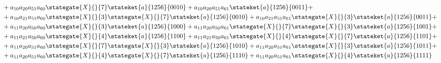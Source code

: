 \begin{align*}
             & +a_{10}a_{20}a_{51}a_{60} \stategate{X}{}{7}\stateket{a}{1256}{0010} +
  a_{10}a_{20}a_{51}a_{61} \stateket{a}{1256}{0011} +                                                                        \\
             & +a_{10}a_{21}a_{51}a_{60} \stategate{X}{}{3}\stategate{X}{}{7}\stateket{a}{1256}{0010} +
  a_{10}a_{21}a_{51}a_{61} \stategate{X}{}{3}\stateket{a}{1256}{0011} +                                                      \\
             & +a_{11}a_{20}a_{50}a_{60} \stategate{X}{}{3}\stateket{a}{1256}{1000}+
  a_{11}a_{20}a_{50}a_{61} \stategate{X}{}{7}\stategate{X}{}{3}\stateket{a}{1256}{1001}+                                     \\
             & +a_{11}a_{21}a_{50}a_{60} \stategate{X}{}{4}\stateket{a}{1256}{1100} +
  a_{11}a_{21}a_{50}a_{61} \stategate{X}{}{4}\stategate{X}{}{7}\stateket{a}{1256}{1101} +                                    \\
             & +a_{11}a_{20}a_{51}a_{60} \stategate{X}{}{7}\stategate{X}{}{3}\stateket{a}{1256}{1010}+
  a_{11}a_{20}a_{51}a_{61} \stategate{X}{}{3}\stateket{a}{1256}{1011}+                                                       \\
             & +a_{11}a_{20}a_{51}a_{60} \stategate{X}{}{4}\stategate{X}{}{7}\stateket{a}{1256}{1110}+
  a_{11}a_{20}a_{51}a_{61} \stategate{X}{}{4}\stateket{a}{1256}{1111}                                                        \\
\end{align*}

